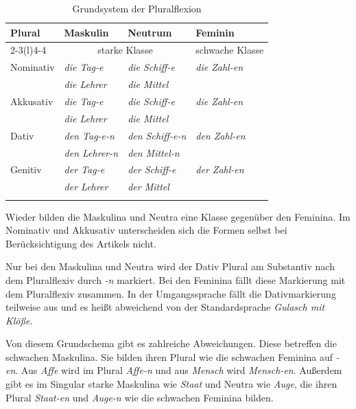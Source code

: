 \begin{table}
  \centering
  \begin{tabularx}{\textwidth}{l XX l}
    \lsptoprule
    Plural & Maskulin & Neutrum & Feminin \\
    \cmidrule(l){2-3}\cmidrule(l){4-4}
    & \multicolumn{2}{c}{starke Klasse} & schwache Klasse \\
    \hline
    Nominativ & \textit{die Tag-e} & \textit{die Schiff-e} & \textit{die Zahl-en} \\
    & \textit{die Lehrer} & \textit{die Mittel} &  \\
    
    Akkusativ & \textit{die Tag-e} & \textit{die Schiff-e} & \textit{die Zahl-en} \\
    & \textit{die Lehrer} & \textit{die Mittel} &  \\
    
    Dativ & \textit{den Tag-e-n} & \textit{den Schiff-e-n} & \textit{den Zahl-en} \\
    & \textit{den Lehrer-n} & \textit{den Mittel-n} &  \\
    
    Genitiv & \textit{der Tag-e} & \textit{der Schiff-e} & \textit{der Zahl-en}  \\
    & \textit{der Lehrer} & \textit{der Mittel} &  \\
    \lspbottomrule 
  \end{tabularx}
  \caption{Grundsystem der Pluralflexion}
  \label{tab:Grundplural_Subst}
\end{table}

Wieder bilden die Maskulina und Neutra eine Klasse gegenüber den Feminina. Im Nominativ und Akkusativ unterscheiden sich die Formen selbst bei Berücksichtigung des Artikels nicht. 

Nur bei den Maskulina und Neutra wird der Dativ Plural am Substantiv nach dem Pluralflexiv durch \textit{-n} markiert. Bei den Feminina fällt diese Markierung mit dem Pluralflexiv zusammen. In der Umgangssprache fällt die Dativmarkierung teilweise aus und es heißt abweichend von der Standardsprache \zB \textit{Gulasch mit Klöße}.

Von diesem Grundschema gibt es zahlreiche Abweichungen. Diese betreffen die schwachen Maskulina. Sie bilden ihren Plural wie die schwachen Feminina auf \textit{-en}. Aus \textit{Affe} wird im Plural \textit{Affe-n} und aus \textit{Mensch} wird \textit{Mensch-en}. Außerdem gibt es im Singular starke Maskulina wie \textit{Staat} und Neutra wie \textit{Auge}, die ihren Plural \textit{Staat-en} und \textit{Auge-n} wie die schwachen Feminina bilden. 

